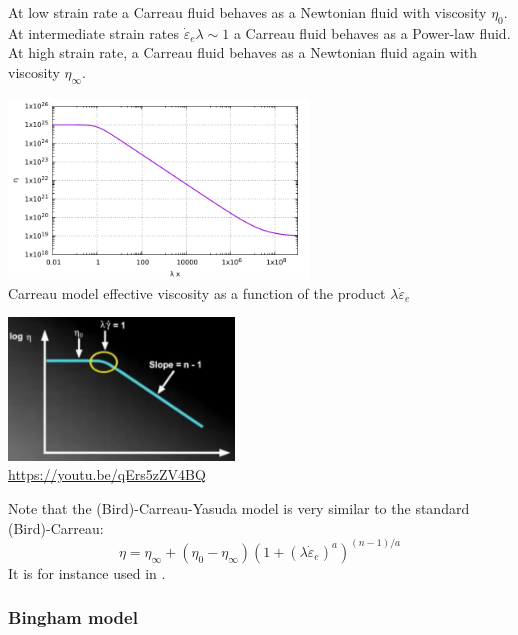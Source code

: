 At low strain rate a Carreau fluid behaves as a Newtonian fluid with viscosity $\eta_0$.
At intermediate strain rates $\dot{\varepsilon}_{e} \lambda \sim 1$ a Carreau fluid behaves 
as a Power-law fluid. At high strain rate, a Carreau fluid behaves as a Newtonian fluid 
again with viscosity $\eta_\infty$.
 
\begin{center}
\includegraphics[width=8cm]{images/rheology/carreau/carreau.pdf}\\
{\captionfont Carreau model effective viscosity as a function of the product $\lambda \dot{\varepsilon}_{e}$}
\end{center}

\begin{center}
\includegraphics[width=6cm]{images/rheology/carreau/carreau1}\\
{\captionfont \url{https://youtu.be/qErs5zZV4BQ}}
\end{center}

Note that the (Bird)-Carreau-Yasuda model \cite{osru14} is very similar to the standard (Bird)-Carreau:
\begin{equation}
\eta = \eta_\infty + (\eta_0-\eta_\infty) \left(1 + (\lambda \dot{\varepsilon}_{e})^a \right)^{(n-1)/a}
\end{equation}
It is for instance used in \cite{vadv03}.

\Literature \cite{berc95,marc00}

\subsubsection{Bingham model} \label{sec:bingham}

